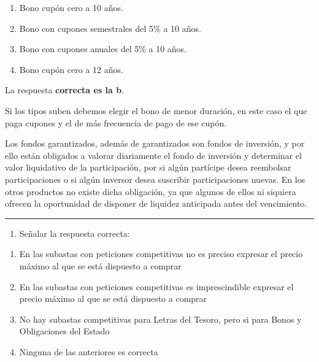 \documentclass[
  letterpaper,
  DIV=11,
  numbers=noendperiod]{scrreprt}
\providecommand{\tightlist}{%
  \setlength{\itemsep}{0pt}\setlength{\parskip}{0pt}}\usepackage{longtable,booktabs,array}
\begin{document}
\begin{enumerate}
\def\labelenumi{\alph{enumi})}
\item
  Bono cupón cero a 10 años.
\item
  Bono con cupones semestrales del 5\% a 10 años.
\item
  Bono con cupones anuales del 5\% a 10 años.
\item
  Bono cupón cero a 12 años.
\end{enumerate}

\begin{tcolorbox}[enhanced jigsaw, left=2mm, opacityback=0, colback=white, breakable, arc=.35mm, bottomrule=.15mm, rightrule=.15mm, toprule=.15mm, leftrule=.75mm, colframe=quarto-callout-tip-color-frame]
\begin{minipage}[t]{5.5mm}
\textcolor{quarto-callout-tip-color}{\faLightbulb}
\end{minipage}%
\begin{minipage}[t]{\textwidth - 5.5mm}

La respuesta \textbf{correcta es la b}.

Si los tipos suben debemos elegir el bono de menor duración, en este
caso el que paga cupones y el de más frecuencia de pago de ese cupón.

Los fondos garantizados, además de garantizados son fondos de inversión,
y por ello están obligados a valorar diariamente el fondo de inversión y
determinar el valor liquidativo de la participación, por si algún
partícipe desea reembolsar participaciones o si algún inversor desea
suscribir participaciones nuevas. En los otros productos no existe dicha
obligación, ya que algunos de ellos ni siquiera ofrecen la oportunidad
de disponer de liquidez anticipada antes del vencimiento.

\end{minipage}%
\end{tcolorbox}

\begin{center}\rule{0.5\linewidth}{0.5pt}\end{center}

\begin{enumerate}
\def\labelenumi{\arabic{enumi}.}
\setcounter{enumi}{102}
\tightlist
\item
  Señalar la respuesta correcta:
\end{enumerate}

\begin{enumerate}
\def\labelenumi{\alph{enumi})}
\item
  En las subastas con peticiones competitivas no es preciso expresar el
  precio máximo al que se está dispuesto a comprar
\item
  En las subastas con peticiones competitivas es imprescindible expresar
  el precio máximo al que se está dispuesto a comprar
\item
  No hay subastas competitivas para Letras del Tesoro, pero si para
  Bonos y Obligaciones del Estado
\item
  Ninguna de las anteriores es correcta
\end{enumerate}
\end{document}
